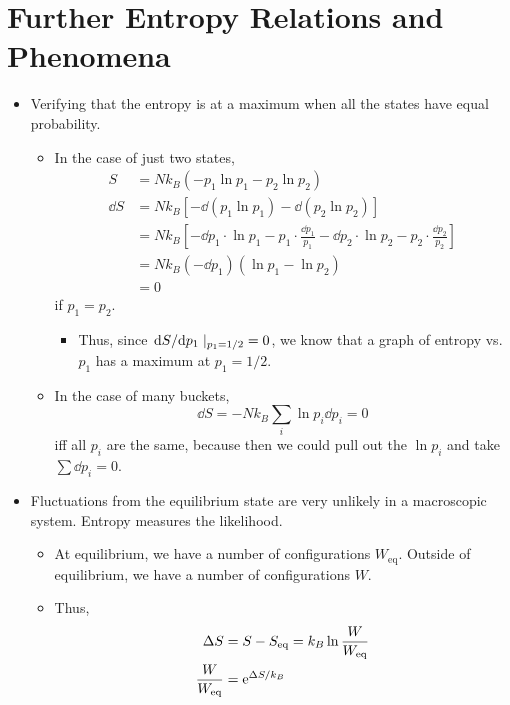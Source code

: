\documentclass[../notes.tex]{subfiles}
\begin{document}
\section{Further Entropy Relations and Phenomena}
\begin{itemize}
    \item {}Verifying that the entropy is at a maximum when all the states have equal probability.
    \begin{itemize}
        \item In the case of just two states,
        \begin{align*}
            S &= Nk_B(-p_1\ln p_1-p_2\ln p_2)\\
            \dd{S} &= Nk_B[-\dd{(p_1\ln p_1)}-\dd{(p_2\ln p_2)}]\\
            &= Nk_B[-\dd{p_1}\cdot\ln p_1-p_1\cdot\frac{\dd{p_1}}{p_1}-\dd{p_2}\cdot\ln p_2-p_2\cdot\frac{\dd{p_2}}{p_2}]\\
            &= Nk_B(-\dd{p_1})(\ln p_1-\ln p_2)\\
            &= 0
        \end{align*}
        if $p_1=p_2$.
        \begin{itemize}
            \item Thus, since $\dv*{S}{p_1}|_{p_1=1/2}=0$, we know that a graph of entropy vs. $p_1$ has a maximum at $p_1=1/2$.
        \end{itemize}
        \item In the case of many buckets,
        \begin{equation*}
            \dd{S} = -Nk_B\sum_i\ln p_i\dd{p_i} = 0
        \end{equation*}
        iff all $p_i$ are the same, because then we could pull out the $\ln p_i$ and take $\sum\dd{p_i}=0$.
    \end{itemize}
    \item Fluctuations from the equilibrium state are very unlikely in a macroscopic system. Entropy measures the likelihood.
    \begin{itemize}
        \item At equilibrium, we have a number of configurations $W_\text{eq}$. Outside of equilibrium, we have a number of configurations $W$.
        \item Thus,
        \begin{align*}
            \Delta S &= S-S_\text{eq} = k_B\ln\frac{W}{W_\text{eq}}\\
            \frac{W}{W_\text{eq}} &= \e[\Delta S/k_B]

\end{align*}
\end{itemize}
\end{itemize}
\end{document}
